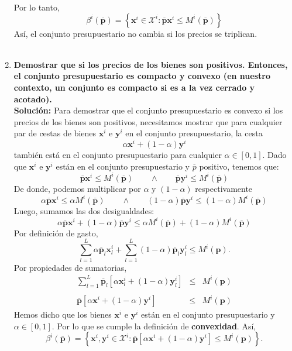 \begin{enumerate}
	Por lo tanto,
	$$\beta^i\left(\overline{\textbf{p}}\right)=\left\{\textbf{x}^i\in \mathcal{X}^i:\overline{\textbf{p}}\textbf{x}^i\leq M^i\left(\overline{\textbf{p}}\right)\right\}$$
	Así, el conjunto presupuestario no cambia si los precios se triplican.\\\\


    \item \textbf{Demostrar que si los precios de los bienes son positivos. Entonces, el conjunto presupuestario es compacto y convexo (en nuestro contexto, un conjunto es compacto si es a la vez cerrado y acotado).}\\

	\textbf{Solución:} Para demostrar que el conjunto presupuestario es convexo si los precios de los bienes son positivos, necesitamos mostrar que para cualquier par de cestas de bienes $\textbf{x}^i$ e $\textbf{y}^i$ en el conjunto presupuestario, la cesta 
	$$\alpha\textbf{x}^i + (1-\alpha)\textbf{y}^i$$ 
	también está en el conjunto presupuestario para cualquier $\alpha \in [0,1]$. Dado que $\textbf{x}^i$ e $\textbf{y}^i$ están en el conjunto presupuestario y $\overline{p}$ positivo, tenemos que:
	$$\overline{\textbf{p}}\textbf{x}^i\leq M^i\left(\overline{\textbf{p}}\right) \qquad \land \qquad \overline{\textbf{p}}\textbf{y}^i\leq M^i\left(\overline{\textbf{p}}\right)$$
	De donde, podemos multiplicar por $\alpha$ y $(1-\alpha)$ respectivamente
	$$\alpha\overline{\textbf{p}}\textbf{x}^i\leq \alpha M^i\left(\overline{\textbf{p}}\right) \qquad \land \qquad (1-\alpha)\overline{\textbf{p}}\textbf{y}^i\leq (1-\alpha)M^i\left(\overline{\textbf{p}}\right)$$
	Luego, sumamos las dos desigualdades:
	$$\alpha\overline{\textbf{p}}\textbf{x}^i + (1-\alpha)\overline{\textbf{p}}\textbf{y}^i\leq \alpha M^i\left(\overline{\textbf{p}}\right) + (1-\alpha)M^i\left(\overline{\textbf{p}}\right)$$
	Por definición de gasto,
	$$\sum_{l=1}^L \alpha\overline{\textbf{p}}_l\textbf{x}_l^i + \sum_{l=1}^L (1-\alpha)\overline{\textbf{p}}_l\textbf{y}_l^i\leq M^i(\textbf{p}).$$
	Por propiedades de sumatorias,
	$$
	\begin{array}{rcl}
	    \displaystyle\sum_{l=1}^L \overline{\textbf{p}}_l\left[\alpha\textbf{x}_l^i + (1-\alpha)\textbf{y}_l^i\right] &\leq& M^i(\textbf{p})\\\\
	    \overline{\textbf{p}}\left[\alpha\textbf{x}^i + (1-\alpha)\textbf{y}^i\right] &\leq& M^i(\textbf{p})
	\end{array}
	$$
	Hemos dicho que los bienes $\textbf{x}^i$ e $\textbf{y}^i$ están en el conjunto presupuestario y $\alpha \in [0,1]$. Por lo que se cumple la definición de \textbf{convexidad}. Así,
	$$\beta^i\left(\overline{\textbf{p}}\right)=\left\{\textbf{x}^i, \textbf{y}^i\in \mathcal{X}^i:\overline{\textbf{p}}\left[\alpha\textbf{x}^i + (1-\alpha)\textbf{y}^i\right]\leq M^i(\textbf{p})\right\}.$$


\end{enumerate}

